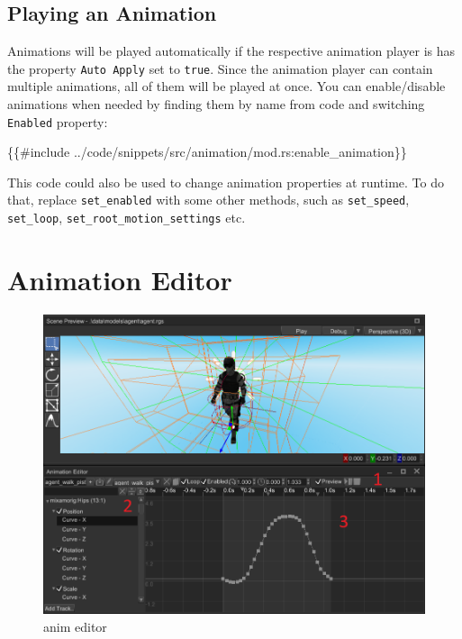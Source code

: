 \documentclass[
]{book}
\newenvironment{Shaded}{\begin{snugshade}}{\end{snugshade}}
\newcommand{\NormalTok}[1]{#1}
\theoremstyle{definition}
\theoremstyle{definition}
\theoremstyle{definition}
\theoremstyle{definition}
\theoremstyle{remark}
\begin{document}
\subsection{Playing an Animation}\label{playing-an-animation}

Animations will be played automatically if the respective animation player is has the property \texttt{Auto\ Apply} set to \texttt{true}. Since the animation player can contain multiple animations, all of them will be played at once. You can enable/disable animations when needed by finding them by name from code and switching \texttt{Enabled} property:

\begin{Shaded}
\begin{Highlighting}[]
\NormalTok{\{\{\#include ../code/snippets/src/animation/mod.rs:enable\_animation\}\}}
\end{Highlighting}
\end{Shaded}

This code could also be used to change animation properties at runtime. To do that, replace \texttt{set\_enabled} with some other methods, such as \texttt{set\_speed}, \texttt{set\_loop}, \texttt{set\_root\_motion\_settings} etc.

\section{Animation Editor}\label{animation-editor}

\begin{figure}
\centering
\includegraphics{images/animation/anim_editor.png}
\caption{anim editor}
\end{figure}
\end{document}
